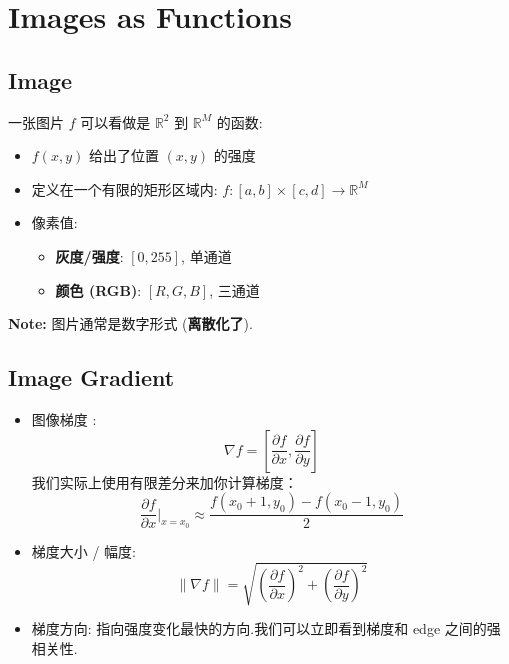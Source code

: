 \chapter{Images as Functions}

\section{Image}

一张图片 $ f $ 可以看做是 $ \mathbb{R}^2 $ 到 $ \mathbb{R}^M $ 的函数:
\begin{itemize}
    \item $ f(x,y) $ 给出了位置 $ (x,y) $ 的强度
    \item 定义在一个有限的矩形区域内:
    $ f: [a,b] \times [c,d] \rightarrow \mathbb{R}^M $
    \item 像素值:
    \begin{itemize}
        \item \textbf{灰度/强度}: $[0,255]$, 单通道
        \item \textbf{颜色 (RGB)}: $[R, G, B]$, 三通道
    \end{itemize}
\end{itemize}

\textbf{Note:} 图片通常是数字形式 (\textbf{离散化了}).

\section{Image Gradient}
\begin{itemize}
    \item 图像梯度 :
    $$
    \nabla f = \left[\frac{\partial f}{\partial x}, \frac{\partial f}{\partial y}\right]
    $$
    我们实际上使用有限差分来加你计算梯度：
    $$
    \frac{\partial f}{\partial x} \bigg|_{x=x_0} \approx \frac{f(x_0 + 1, y_0) - f(x_0 - 1, y_0)}{2}
    $$
    \item 梯度大小 / 幅度:
    $$
    \|\nabla f\| = \sqrt{\left(\frac{\partial f}{\partial x}\right)^2 + \left(\frac{\partial f}{\partial y}\right)^2}
    $$
    \item 梯度方向: 指向强度变化最快的方向.我们可以立即看到梯度和 edge 之间的强相关性.
\end{itemize}

